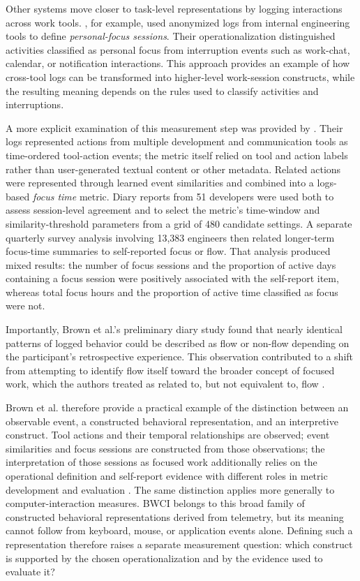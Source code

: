 Other systems move closer to task-level representations by logging interactions across work tools. \textcite{chen2022workgraph}, for example, used anonymized logs from internal engineering tools to define \emph{personal-focus sessions}. Their operationalization distinguished activities classified as personal focus from interruption events such as work-chat, calendar, or notification interactions. This approach provides an example of how cross-tool logs can be transformed into higher-level work-session constructs, while the resulting meaning depends on the rules used to classify activities and interruptions.

A more explicit examination of this measurement step was provided by \textcite{brown2023focusedWork}. Their logs represented actions from multiple development and communication tools as time-ordered tool-action events; the metric itself relied on tool and action labels rather than user-generated textual content or other metadata. Related actions were represented through learned event similarities and combined into a logs-based \emph{focus time} metric. Diary reports from 51 developers were used both to assess session-level agreement and to select the metric's time-window and similarity-threshold parameters from a grid of 480 candidate settings. A separate quarterly survey analysis involving 13,383 engineers then related longer-term focus-time summaries to self-reported focus or flow. That analysis produced mixed results: the number of focus sessions and the proportion of active days containing a focus session were positively associated with the self-report item, whereas total focus hours and the proportion of active time classified as focus were not.

Importantly, Brown et al.'s preliminary diary study found that nearly identical patterns of logged behavior could be described as flow or non-flow depending on the participant's retrospective experience. This observation contributed to a shift from attempting to identify flow itself toward the broader concept of focused work, which the authors treated as related to, but not equivalent to, flow \parencite{brown2023focusedWork}.

Brown et al. therefore provide a practical example of the distinction between an observable event, a constructed behavioral representation, and an interpretive construct. Tool actions and their temporal relationships are observed; event similarities and focus sessions are constructed from those observations; the interpretation of those sessions as focused work additionally relies on the operational definition and self-report evidence with different roles in metric development and evaluation \parencite{brown2023focusedWork}. The same distinction applies more generally to computer-interaction measures. BWCI belongs to this broad family of constructed behavioral representations derived from telemetry, but its meaning cannot follow from keyboard, mouse, or application events alone. Defining such a representation therefore raises a separate measurement question: which construct is supported by the chosen operationalization and by the evidence used to evaluate it?

